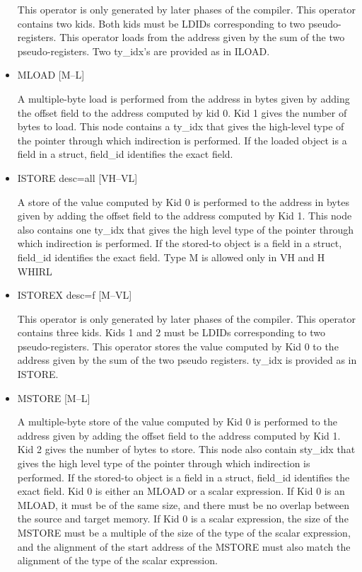 \documentclass{article}
\begin{document}
\begin{itemize}
This operator is only generated by later phases of the compiler.
This operator contains two kids. Both kids must be
LDIDs corresponding to two
pseudo-registers. This operator loads from the address
given by the sum of the two pseudo-registers. Two ty\_idx's are
provided as in
ILOAD.

\item  MLOAD \hfill [M--L]

A multiple-byte load is performed from the address in bytes given
by adding the offset field to the address computed by kid 0. Kid 1
gives the number of bytes to load. This node contains a ty\_idx that gives the
high-level type of the pointer through which indirection is performed.
If the loaded object is a field in a struct, field\_id identifies
the exact field. 

\item  ISTORE desc=all \hfill [VH--VL]

A store of the value computed by Kid 0 is performed to the address
in bytes given by adding the offset field to the address computed
by Kid 1.
This node also contains one ty\_idx that gives the high level type
of the pointer through which indirection is performed. If the
stored-to object is a field in a struct, field\_id identifies the
exact field. Type M is allowed only in VH and H WHIRL

\item  ISTOREX desc=f \hfill [M--VL]

This operator is only generated by later phases of the compiler.
This operator contains three kids. Kids 1 and 2 must be
LDIDs corresponding to two pseudo-registers. This operator stores
the value computed by Kid 0
to the address given by the sum of the two pseudo registers. ty\_idx
is provided as in
ISTORE.

\item  MSTORE \hfill [M--L]

A multiple-byte store of the value computed by Kid 0 is performed
to the address given by adding the offset field to the address
computed by Kid
1. Kid 2 gives the number of bytes to store. This node also
contain sty\_idx that gives the high level type of the pointer through
which indirection is performed. If the stored-to object is a field
in a struct, field\_id identifies the exact field. Kid 0 is either
an MLOAD or a scalar expression. If Kid 0 is an MLOAD, it must be of
the same size, and there must be no overlap between the source and
target memory. If Kid 0 is a scalar expression, the size of the
MSTORE must be a multiple of the size of the type of the scalar
expression, and the alignment of the start address of the MSTORE
must also match the alignment of the type of the scalar expression.

\end{itemize}
\end{document}
